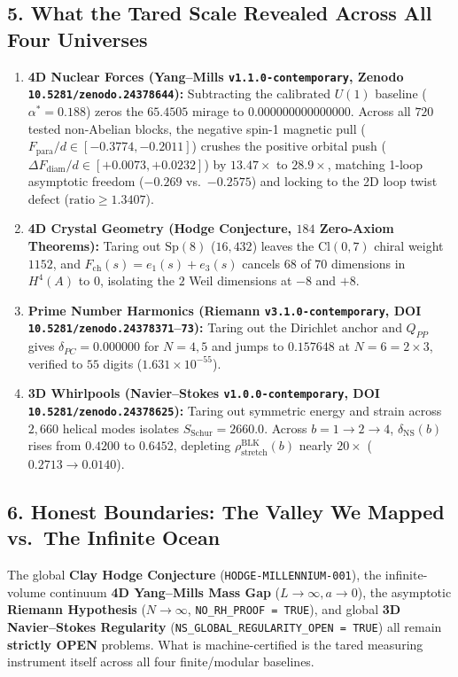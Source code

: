 \documentclass[11pt,a4paper]{article}
\begin{document}
\subsection*{5. What the Tared Scale Revealed Across All Four Universes}

\begin{enumerate}
  \item \textbf{4D Nuclear Forces (Yang--Mills \texttt{v1.1.0-contemporary}, Zenodo \texttt{10.5281/zenodo.24378644}):} Subtracting the calibrated $U(1)$ baseline ($\alpha^*=0.188$) zeros the $65.4505$ mirage to $0.000000000000000$. Across all $720$ tested non-Abelian blocks, the negative spin-1 magnetic pull ($F_{\mathrm{para}}/d \in [-0.3774, -0.2011]$) crushes the positive orbital push ($\Delta F_{\mathrm{diam}}/d \in [+0.0073, +0.0232]$) by $13.47\times$ to $28.9\times$, matching 1-loop asymptotic freedom ($-0.269$ vs.\ $-0.2575$) and locking to the 2D loop twist defect ($\text{ratio} \ge 1.3407$).
  \item \textbf{4D Crystal Geometry (Hodge Conjecture, $184$ Zero-Axiom Theorems):} Taring out $\mathrm{Sp}(8)$ ($16, 432$) leaves the $\mathrm{Cl}(0,7)$ chiral weight $1152$, and $F_{\mathrm{ch}}(s) = e_1(s) + e_3(s)$ cancels $68$ of $70$ dimensions in $H^4(A)$ to $0$, isolating the $2$ Weil dimensions at $-8$ and $+8$.
  \item \textbf{Prime Number Harmonics (Riemann \texttt{v3.1.0-contemporary}, DOI \texttt{10.5281/zenodo.24378371}--\texttt{73}):} Taring out the Dirichlet anchor and $Q_{PP}$ gives $\delta_{PC}=0.000000$ for $N=4,5$ and jumps to $0.157648$ at $N=6=2\times 3$, verified to $55$ digits ($1.631\times 10^{-55}$).
  \item \textbf{3D Whirlpools (Navier--Stokes \texttt{v1.0.0-contemporary}, DOI \texttt{10.5281/zenodo.24378625}):} Taring out symmetric energy and strain across $2{,}660$ helical modes isolates $S_{\mathrm{Schur}} = 2660.0$. Across $b = 1 \to 2 \to 4$, $\delta_{\mathrm{NS}}(b)$ rises from $0.4200$ to $0.6452$, depleting $\rho_{\mathrm{stretch}}^{\mathrm{BLK}}(b)$ nearly $20\times$ ($0.2713 \to 0.0140$).
\end{enumerate}

\subsection*{6. Honest Boundaries: The Valley We Mapped vs.\ The Infinite Ocean}

The global \textbf{Clay Hodge Conjecture} (\texttt{HODGE-MILLENNIUM-001}), the infinite-volume continuum \textbf{4D Yang--Mills Mass Gap} ($L\to\infty, a\to 0$), the asymptotic \textbf{Riemann Hypothesis} ($N\to\infty$, \texttt{NO\_RH\_PROOF = TRUE}), and global \textbf{3D Navier--Stokes Regularity} (\texttt{NS\_GLOBAL\_REGULARITY\_OPEN = TRUE}) all remain \textbf{strictly OPEN} problems. What is machine-certified is the tared measuring instrument itself across all four finite/modular baselines.
\end{document}
